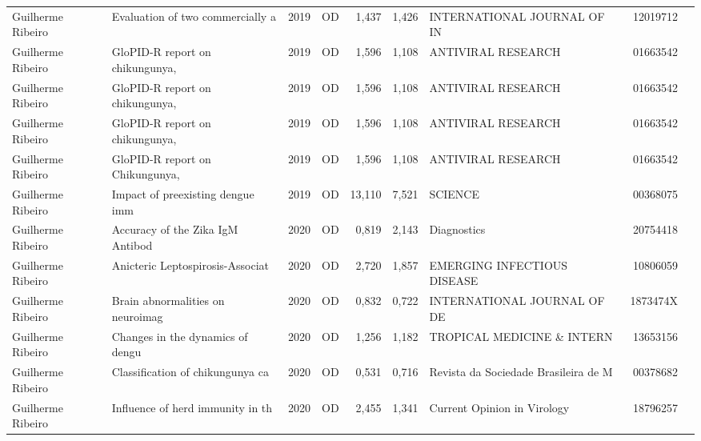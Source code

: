 \documentclass[12pt,brazil]{article}\usepackage[]{graphicx}\usepackage[]{xcolor}
\begin{document}
\begin{longtable}{lllrrllrr}
Guilherme Ribeiro & Evaluation of two commercially a & 2019 & OD & 1,437 & 1,426 & INTERNATIONAL JOURNAL OF IN & 12019712 \\
Guilherme Ribeiro & GloPID-R report on chikungunya,  & 2019 & OD & 1,596 & 1,108 & ANTIVIRAL RESEARCH & 01663542 \\
\rowcolor{duplic}\rowcolor{duplic}\rowcolor{duplic}\rowcolor{duplic}\rowcolor{duplic}\rowcolor{duplic}\rowcolor{duplic}\rowcolor{duplic}\rowcolor{duplic}\rowcolor{duplic}\rowcolor{duplic}\rowcolor{duplic}\rowcolor{duplic}\rowcolor{duplic}\rowcolor{duplic}\rowcolor{duplic}Guilherme Ribeiro & GloPID-R report on chikungunya,  & 2019 & OD & 1,596 & 1,108 & ANTIVIRAL RESEARCH & 01663542 \\
\rowcolor{duplic}\rowcolor{duplic}\rowcolor{duplic}\rowcolor{duplic}\rowcolor{duplic}\rowcolor{duplic}\rowcolor{duplic}\rowcolor{duplic}\rowcolor{duplic}\rowcolor{duplic}\rowcolor{duplic}\rowcolor{duplic}\rowcolor{duplic}\rowcolor{duplic}\rowcolor{duplic}\rowcolor{duplic}Guilherme Ribeiro & GloPID-R report on chikungunya,  & 2019 & OD & 1,596 & 1,108 & ANTIVIRAL RESEARCH & 01663542 \\
\rowcolor{duplic}\rowcolor{duplic}\rowcolor{duplic}\rowcolor{duplic}\rowcolor{duplic}\rowcolor{duplic}\rowcolor{duplic}\rowcolor{duplic}\rowcolor{duplic}\rowcolor{duplic}\rowcolor{duplic}\rowcolor{duplic}\rowcolor{duplic}\rowcolor{duplic}\rowcolor{duplic}\rowcolor{duplic}Guilherme Ribeiro & GloPID-R report on Chikungunya,  & 2019 & OD & 1,596 & 1,108 & ANTIVIRAL RESEARCH & 01663542 \\
Guilherme Ribeiro & Impact of preexisting dengue imm & 2019 & OD & 13,110 & 7,521 & SCIENCE & 00368075 \\
Guilherme Ribeiro & Accuracy of the Zika IgM Antibod & 2020 & OD & 0,819 & 2,143 & Diagnostics & 20754418 \\
Guilherme Ribeiro & Anicteric Leptospirosis-Associat & 2020 & OD & 2,720 & 1,857 & EMERGING INFECTIOUS DISEASE & 10806059 \\
Guilherme Ribeiro & Brain abnormalities on neuroimag & 2020 & OD & 0,832 & 0,722 & INTERNATIONAL JOURNAL OF DE & 1873474X \\
Guilherme Ribeiro & Changes in the dynamics of dengu & 2020 & OD & 1,256 & 1,182 & TROPICAL MEDICINE \& INTERN & 13653156 \\
Guilherme Ribeiro & Classification of chikungunya ca & 2020 & OD & 0,531 & 0,716 & Revista da Sociedade Brasileira de M & 00378682 \\
Guilherme Ribeiro & Influence of herd immunity in th & 2020 & OD & 2,455 & 1,341 & Current Opinion in Virology & 18796257 \\

\end{longtable}
\end{document}
